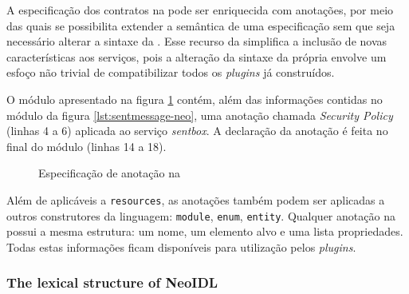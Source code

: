 A especificação dos contratos na \neoidl{} pode ser enriquecida com
anotações, por meio das quais se possibilita extender a semântica de uma
especificação sem que seja necessário alterar a sintaxe da \neoidl{}. Esse
recurso da \neoidl{} simplifica a inclusão de novas características aos
serviços, pois a alteração da sintaxe da própria \neoidl{} envolve um esfoço não
trivial de compatibilizar todos os \textit{plugins} já construídos.

O módulo apresentado na figura \ref{lst:annotationNeoIDL} contém, além das
informações contidas no módulo da figura \ref{lst:sentmessage-neo}, uma anotação chamada
\emph{Security Policy} (linhas 4 a 6) aplicada ao serviço \emph{sentbox}. A
declaração da anotação é feita no final do módulo (linhas 14 a 18).

\vspace{6mm}
 
\begin{figure}
\begin{small}

\vspace{-.5cm}
\end{small}
\caption{Especificação de anotação na \neoidl{}}
\label{lst:annotationNeoIDL}
\end{figure}

Além de aplicáveis a \texttt{resources}, as anotações também podem ser aplicadas
a outros construtores da linguagem: \texttt{module}, \texttt{enum},
\texttt{entity}. Qualquer anotação na \neoidl{} possui a mesma estrutura: um
nome, um elemento alvo e uma lista propriedades. Todas estas informações ficam
disponíveis para utilização pelos \textit{plugins}.




\subsubsection{The lexical structure of NeoIDL}\label{sub:lexical}

